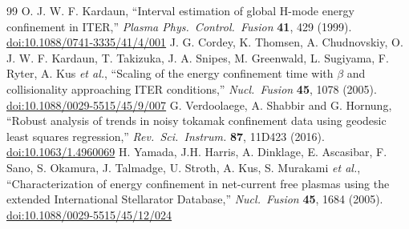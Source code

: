 \documentclass[12pt,letterpaper]{article}
\begin{document}
\begin{thebibliography}{99}
 O. J. W. F. Kardaun, ``Interval estimation of global H-mode
energy confinement in ITER,'' \emph{Plasma Phys.\ Control.\ Fusion} \textbf{41},
429 (1999).
\href{https://doi.org/10.1088/0741-3335/41/4/001}{doi:10.1088/0741-3335/41/4/001}
 J. G. Cordey, K. Thomsen, A. Chudnovskiy, O. J. W. F. Kardaun, T. Takizuka,
J. A. Snipes, M. Greenwald, L. Sugiyama, F. Ryter, A. Kus \emph{et al.},
``Scaling of the energy confinement
time with $\beta$ and collisionality approaching ITER conditions,'' \emph{Nucl.\
Fusion} \textbf{45}, 1078 (2005).
\href{https://doi.org/10.1088/0029-5515/45/9/007}{doi:10.1088/0029-5515/45/9/007}
\bibitem{gls} G. Verdoolaege, A. Shabbir and G. Hornung, ``Robust analysis of
trends in noisy tokamak confinement data using geodesic least squares
regression,'' \emph{Rev.\ Sci.\ Instrum.} \textbf{87}, 11D423 (2016).
\href{https://doi.org/10.1063/1.4960069}{doi:10.1063/1.4960069}
 H. Yamada, J.H. Harris, A. Dinklage, E. Ascasibar, F. Sano, S. Okamura,
J. Talmadge, U. Stroth, A. Kus, S. Murakami \emph{et al.}, ``Characterization of energy
confinement in net-current free plasmas using the extended International
Stellarator Database,'' \emph{Nucl.\ Fusion} \textbf{45}, 1684 (2005).
\href{https://doi.org/10.1088/0029-5515/45/12/024}{doi:10.1088/0029-5515/45/12/024}
\end{thebibliography}
\end{document}
